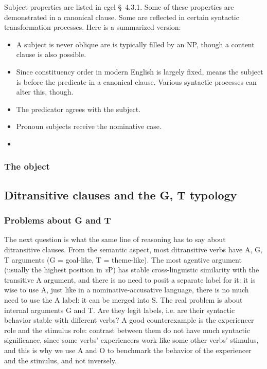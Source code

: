 \documentclass{article}
\newcommand*{\citesec}[1]{\S~{#1}}
\newcommand*{\vP}{\textit{v}P}
\begin{document}
Subject properties are listed in \ac{cgel} \citesec{4.3.1}. 
Some of these properties are demonstrated in a canonical clause.
Some are reflected in certain syntactic transformation processes.
Here is a summarized version:
\begin{itemize}
    \item A subject is never oblique are is typically filled by an NP, though a content clause is also possible.
    \item Since constituency order in modern English is largely fixed,
     means the subject is before the predicate in a canonical clause.
    Various syntactic processes can alter this, though.
    \item The predicator agrees with the subject.
    \item Pronoun subjects receive the nominative case.
    \item  
\end{itemize}

\subsubsection{The object}

\subsection{Ditransitive clauses and the G, T typology}\label{sec:gt-typology}

\subsubsection{Problems about G and T}

The next question is what the same line of reasoning has to say about ditransitive clauses. 
From the semantic aspect,
most ditransitive verbs have A, G, T arguments (G = goal-like, T = theme-like).
The most agentive argument (usually the highest position in \vP) 
has stable cross-linguistic similarity with the transitive A argument, %
and there is no need to posit a separate label for it: it is wise to use A,
just like in a nominative-accusative language, 
there is no much need to use the A label: it can be merged into S.
The real problem is about internal arguments G and T.
Are they legit labels, i.e. are their syntactic behavior stable with different verbs?
A good counterexample is the experiencer role and the stimulus role:
contrast between them do not have much syntactic significance,
since some verbs' experiencers work like some other verbs' stimulus,
and this is why we use A and O to benchmark the behavior of the experiencer and the stimulus,
and not inversely.
\end{document}
